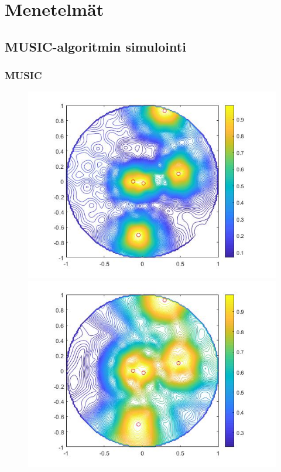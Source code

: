 \section{Menetelmät}

\subsection{MUSIC-algoritmin simulointi}

\subsubsection{MUSIC}
\begin{figure}[h]
    \centering
    \begin{minipage}{0.45\textwidth}
        \centering
        \includegraphics[width=1\textwidth]{MUSICfix.jpg}
    \end{minipage}\hfill
    \begin{minipage}{0.45\textwidth}
        \centering
        \includegraphics[width=1\textwidth]{MUSICfree.jpg} 

\end{minipage}
\end{figure}
